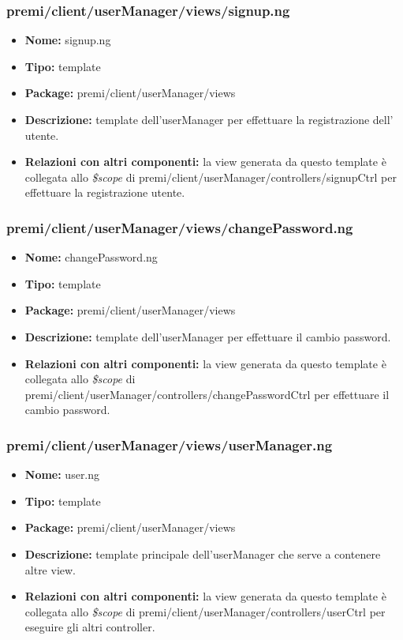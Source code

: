 \subsubsection{premi/client/userManager/views/signup.ng}
\begin{itemize}
  \item[] \textbf{Nome:} signup.ng
  \item[] \textbf{Tipo:} template
  \item[] \textbf{Package:} premi/client/userManager/views
  \item[] \textbf{Descrizione:} template dell'userManager per effettuare la registrazione dell' utente.
  \item[] \textbf{Relazioni con altri componenti:} la view generata da questo template è collegata allo \textit{\$scope} di premi/client/userManager/controllers/signupCtrl per effettuare la registrazione utente.
\end{itemize}

\subsubsection{premi/client/userManager/views/changePassword.ng}
\begin{itemize}
  \item[] \textbf{Nome:} changePassword.ng
  \item[] \textbf{Tipo:} template
  \item[] \textbf{Package:} premi/client/userManager/views
  \item[] \textbf{Descrizione:} template dell'userManager per effettuare il cambio password.
  \item[] \textbf{Relazioni con altri componenti:} la view generata da questo template è collegata allo \textit{\$scope} di premi/client/userManager/controllers/changePasswordCtrl per effettuare il cambio password.
\end{itemize}

\subsubsection{premi/client/userManager/views/userManager.ng}
\begin{itemize}
  \item[] \textbf{Nome:} user.ng
  \item[] \textbf{Tipo:} template
  \item[] \textbf{Package:} premi/client/userManager/views
  \item[] \textbf{Descrizione:} template principale dell'userManager che serve a contenere altre view.
  \item[] \textbf{Relazioni con altri componenti:} la view generata da questo template è collegata allo \textit{\$scope} di premi/client/userManager/controllers/userCtrl per eseguire gli altri controller.
\end{itemize}

